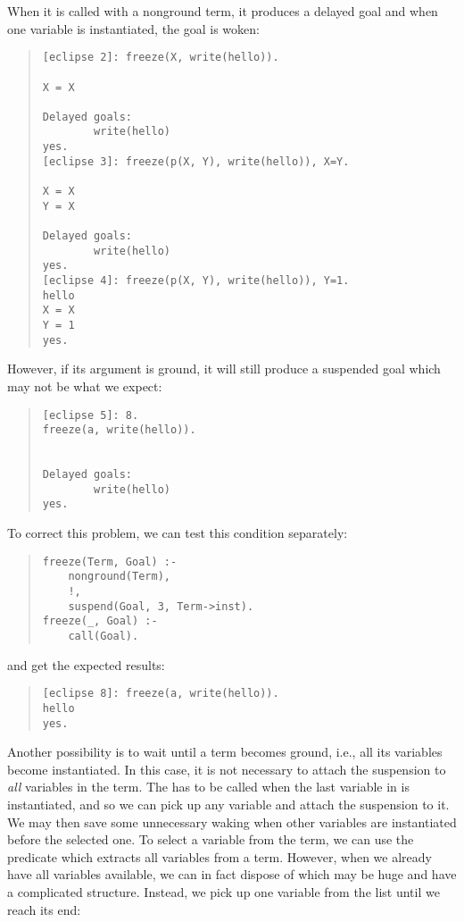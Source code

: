 When it is called with a nonground term, it produces a delayed goal
and when one variable is instantiated, the goal is woken:

\begin{quote}
\begin{verbatim}
[eclipse 2]: freeze(X, write(hello)).

X = X

Delayed goals:
        write(hello)
yes.
[eclipse 3]: freeze(p(X, Y), write(hello)), X=Y.

X = X
Y = X

Delayed goals:
        write(hello)
yes.
[eclipse 4]: freeze(p(X, Y), write(hello)), Y=1.
hello
X = X
Y = 1
yes.
\end{verbatim}
\end{quote}

However, if its argument is ground, it will still produce
a suspended goal which may not be what we expect:
\begin{quote}
\begin{verbatim}
[eclipse 5]: 8.
freeze(a, write(hello)).


Delayed goals:
        write(hello)
yes.
\end{verbatim}
\end{quote}
To correct this problem, we can test this condition separately:
\begin{quote}
\begin{verbatim}
freeze(Term, Goal) :-
    nonground(Term),
    !,
    suspend(Goal, 3, Term->inst).
freeze(_, Goal) :-
    call(Goal).
\end{verbatim}
\end{quote}

and get the expected results:
\begin{quote}
\begin{verbatim}
[eclipse 8]: freeze(a, write(hello)).
hello
yes.
\end{verbatim}
\end{quote}

Another possibility is to wait until a term becomes ground,
i.e., all its variables become instantiated.
In this case, it is not necessary to attach the suspension
to \emph{all} variables in the term.
The  has to be called when the last variable in 
is instantiated, and so we can pick up any variable and
attach the suspension to it.
We may then save some unnecessary waking when other variables
are instantiated before the selected one.
To select a variable from the term,
we can use the predicate
 which
extracts
all variables from a term.
However, when we already have all variables available, we can in fact
dispose of  which may be huge and have
a complicated structure.
Instead, we pick up one variable from the list until
we reach its end:

